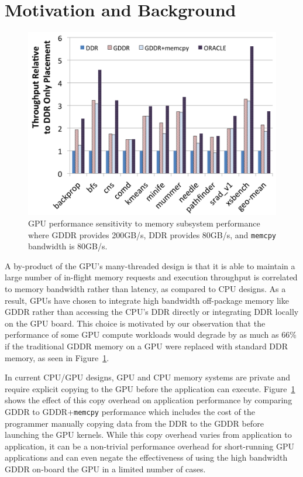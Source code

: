 \vspace{-0.05in}
\section{Motivation and Background}
\label{background}
\vspace{-0.05in}

\begin{figure}[t]
        \includegraphics[width=\columnwidth]{hpca2015/figures/motivation.png}
    \caption{GPU performance sensitivity to memory subsystem performance where GDDR provides 
    200GB/s, DDR provides 80GB/s, and {\tt memcpy} bandwidth is 80GB/s.}
    \label{fig:motivation}
\end{figure}

A by-product of the GPU's many-threaded design is that
it is able to maintain a large number of in-flight memory requests and execution throughput
is correlated to memory bandwidth rather than latency, as compared to CPU designs.  As a result,
GPUs have chosen to integrate high bandwidth off-package memory like GDDR rather than accessing
the CPU's DDR directly or integrating DDR locally on the GPU board.  This choice is motivated
by our observation that the performance of some GPU compute workloads would degrade by as much as 
66\% if the traditional GDDR memory on a GPU were replaced with standard DDR memory, as seen in 
Figure~\ref{fig:motivation}.

In current CPU/GPU designs, GPU and CPU memory systems are private and require
explicit copying to the GPU before the application can execute.   Figure~\ref{fig:motivation}
shows the effect of this copy overhead on application performance by comparing GDDR to GDDR+{\tt memcpy}
performance which includes the cost of the programmer manually copying data from the DDR to the GDDR
before launching the GPU kernels.  While this copy overhead varies from application to application,
it can be a non-trivial performance overhead for short-running GPU applications and can even negate the 
effectiveness of using the high bandwidth GDDR on-board the GPU in a limited number of cases.


